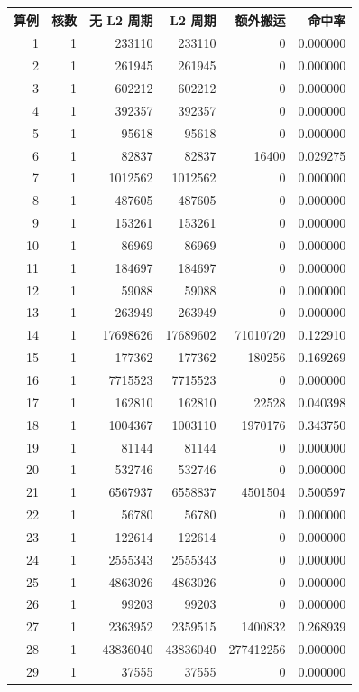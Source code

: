 \begingroup\small\setlength{\tabcolsep}{3pt}
\begin{longtable}{rrrrrr}
\toprule
算例 & 核数 & 无 L2 周期 & L2 周期 & 额外搬运 & 命中率\\\midrule\endhead
1 & 1 & 233110 & 233110 & 0 & 0.000000\\
2 & 1 & 261945 & 261945 & 0 & 0.000000\\
3 & 1 & 602212 & 602212 & 0 & 0.000000\\
4 & 1 & 392357 & 392357 & 0 & 0.000000\\
5 & 1 & 95618 & 95618 & 0 & 0.000000\\
6 & 1 & 82837 & 82837 & 16400 & 0.029275\\
7 & 1 & 1012562 & 1012562 & 0 & 0.000000\\
8 & 1 & 487605 & 487605 & 0 & 0.000000\\
9 & 1 & 153261 & 153261 & 0 & 0.000000\\
10 & 1 & 86969 & 86969 & 0 & 0.000000\\
11 & 1 & 184697 & 184697 & 0 & 0.000000\\
12 & 1 & 59088 & 59088 & 0 & 0.000000\\
13 & 1 & 263949 & 263949 & 0 & 0.000000\\
14 & 1 & 17698626 & 17689602 & 71010720 & 0.122910\\
15 & 1 & 177362 & 177362 & 180256 & 0.169269\\
16 & 1 & 7715523 & 7715523 & 0 & 0.000000\\
17 & 1 & 162810 & 162810 & 22528 & 0.040398\\
18 & 1 & 1004367 & 1003110 & 1970176 & 0.343750\\
19 & 1 & 81144 & 81144 & 0 & 0.000000\\
20 & 1 & 532746 & 532746 & 0 & 0.000000\\
21 & 1 & 6567937 & 6558837 & 4501504 & 0.500597\\
22 & 1 & 56780 & 56780 & 0 & 0.000000\\
23 & 1 & 122614 & 122614 & 0 & 0.000000\\
24 & 1 & 2555343 & 2555343 & 0 & 0.000000\\
25 & 1 & 4863026 & 4863026 & 0 & 0.000000\\
26 & 1 & 99203 & 99203 & 0 & 0.000000\\
27 & 1 & 2363952 & 2359515 & 1400832 & 0.268939\\
28 & 1 & 43836040 & 43836040 & 277412256 & 0.000000\\
29 & 1 & 37555 & 37555 & 0 & 0.000000\\

\end{longtable}
